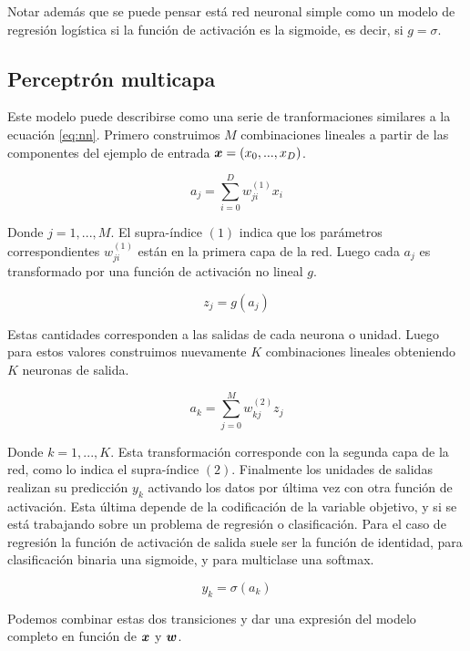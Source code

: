 Notar además que se puede pensar está red neuronal simple como un modelo de
regresión logística si la función de activación es la sigmoide, es decir, si $g
= \sigma$.

\subsection{Perceptrón multicapa}

Este modelo puede describirse como una serie de tranformaciones similares a la
ecuación \ref{eq:nn}. Primero construimos $M$ combinaciones lineales a partir de
las componentes del ejemplo de entrada $\boldsymbol{x} = (x_0, ..., x_D)$.

\begin{equation}
    a_j = \sum_{i = 0}^{D} w_{ji}^{(1)} x_{i}
\end{equation}

Donde $j = 1,..., M$. El supra-índice $(1)$ indica que los parámetros
correspondientes $w_{ji}^{(1)}$ están en la primera capa de la red. Luego cada
$a_j$ es transformado por una función de activación no lineal $g$.

\begin{equation}
    z_j = g(a_j)
\end{equation}

Estas cantidades corresponden a las salidas de cada neurona o unidad. Luego para
estos valores construimos nuevamente $K$ combinaciones lineales obteniendo $K$
neuronas de salida.

\begin{equation}
    a_k = \sum_{j=0}^{M} w_{kj}^{(2)}z_j
\end{equation}

Donde $k= 1,..., K$. Esta transformación corresponde con la segunda capa de la
red, como lo indica el supra-índice $(2)$. Finalmente los unidades de salidas
realizan su predicción $y_k$ activando los datos por última vez con otra función
de activación. Esta última depende de la codificación de la variable objetivo, y
si se está trabajando sobre un problema de regresión o clasificación. Para el
caso de regresión la función de activación de salida suele ser la función de
identidad, para clasificación binaria una sigmoide, y para multiclase una softmax.

\begin{equation}
    y_{k} = \sigma\left( a_k \right)
\end{equation}

Podemos combinar estas dos transiciones y dar una expresión del modelo completo
en función de $\boldsymbol{x}$ y $\boldsymbol{w}$.

